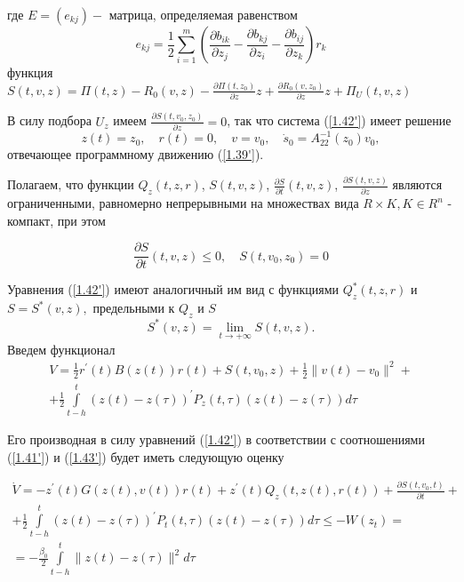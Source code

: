где $E = (e_{kj}) - $ матрица, определяемая равенством 
$$e_{kj} = \frac12 \sum_{ i = 1}^{m} (\frac{\partial b_{ik}}{\partial z_j} - \frac{\partial b_{kj}}{\partial z_i} - \frac{\partial b_{ij}}{\partial z_k}) r_k$$
функция $S(t, v, z) = \Pi (t, z) - R_0 (v, z) - \frac{\partial \Pi (t, z_0)}{\partial z} z + \frac{\partial R_0 (v, z_0)}{\partial z} z + \Pi_U (t, v, z)$

В силу подбора $U_z$ имеем $\frac{\partial S(t, v_0, z_0)}{\partial z} = 0$, так что система (\ref{1.42'}) имеет решение 
$$z(t) = z_0, \quad r(t) = 0, \quad v = v_0, \quad \dot s_0 = A_{22}^{-1} (z_0) v_0,$$ 
отвечающее программному движению (\ref{1.39'}).

Полагаем, что функции $Q_z (t, z, r)$, $S(t, v, z)$, $\frac{\partial S}{\partial t} (t, v, z)$, $\frac{\partial S(t, v, z)}{\partial z}$ являются ограниченными, равномерно непрерывными на множествах вида $R \times K, K \in R^n$ - компакт, при этом

\begin{equation} \label{1.43'}
\frac{\partial S}{\partial t} (t, v, z) \le 0, \quad S(t, v_0, z_0) = 0
\end{equation}

Уравнения (\ref{1.42'}) имеют аналогичный им вид с функциями $Q_z^{*} (t, z, r)$ и $S = S^{*} (v, z),$ предельными к $Q_z$ и $S$
$$S^{*} (v, z) = \lim_{t \to + \infty} S(t, v, z).$$
Введем функционал
$$
\begin{array}{c}
\displaystyle V = \frac12 r^{'}(t) B (z(t)) r(t) + S(t, v_0, z) + \frac12 \| v(t) - v_0 \|^2 +\\
\displaystyle + \frac12 \int\limits_{t - h}^{t} (z(t) - z(\tau))^{'} P_z (t, \tau) (z(t) - z(\tau)) d \tau
\end{array}
$$

Его производная в силу уравнений (\ref{1.42'}) в соответствии с соотношениями (\ref{1.41'}) и (\ref{1.43'}) будет иметь следующую оценку

\begin{equation} \label{1.44'}
\begin{array}{c}
\displaystyle \dot V = - z^{'} (t) G(z(t), v(t)) r(t) + z^{'} (t) Q_z (t, z(t), r(t)) + \frac{\partial S(t, v_0, t)}{\partial t} +\\
\displaystyle + \frac12 \displaystyle\int\limits_{t - h}^{t} (z(t) - z(\tau))^{'} P_t(t, \tau) (z(t) - z(\tau)) d \tau \le - W(z_t) =\\
\displaystyle = -\frac{\beta_0}{2} \displaystyle\int\limits_{t - h}^{t} \| z(t) - z(\tau) \|^2 d \tau
\end{array}
\end{equation}

